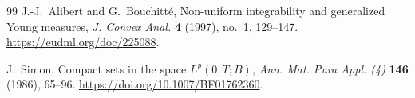 \documentclass[11pt]{article}
\numberwithin{equation}{section}
\theoremstyle{plain}
\theoremstyle{definition}
\theoremstyle{remark}
\begin{document}
\begin{thebibliography}{99}
J.-J.~Alibert and G.~Bouchitt\'e,
\newblock Non-uniform integrability and generalized Young measures,
\newblock \emph{J. Convex Anal.} \textbf{4} (1997), no.~1, 129--147.
\newblock \url{https://eudml.org/doc/225088}.

J.~Simon,
\newblock Compact sets in the space $L^p(0,T;B)$,
\newblock \emph{Ann. Mat. Pura Appl. (4)} \textbf{146} (1986), 65--96.
\newblock \url{https://doi.org/10.1007/BF01762360}.

\end{thebibliography}
\end{document}

